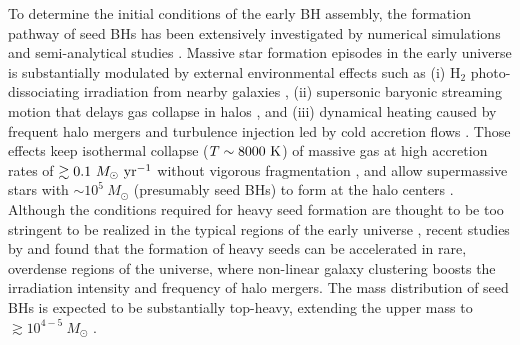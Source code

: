 \documentclass[twocolumn, twocolappendix]{aastex63}
\newcommand{\Msun}{M_\odot}
\newcommand{\Msunyr}{M_\odot~{\rm yr}^{-1}}
\begin{document}
\begin{CJK*}{UTF8}{gbsn}
To determine the initial conditions of the early BH assembly,
the formation pathway of seed BHs has been extensively investigated by numerical simulations and semi-analytical studies
\citep{2006MNRAS.370..289B,2009MNRAS.396..343R,2009ApJ...696.1798T,2012MNRAS.422.2051N,2014ApJ...781...60H,
2015MNRAS.448..568H,2018MNRAS.474.3825V,2021MNRAS.506..613S,2022arXiv220614459T,2022arXiv220505717B}.
Massive star formation episodes in the early universe is substantially modulated by external environmental effects such as
(i) H$_2$ photo-dissociating irradiation from nearby galaxies
\citep{2001ApJ...546..635O,2002ApJ...569..558O,2003Natur.425..812B,2010MNRAS.402.1249S,2014MNRAS.445..544S,2014MNRAS.445..107V,2016ApJ...832..134C},
(ii) supersonic baryonic streaming motion that delays gas collapse in halos
\citep{2012MNRAS.424.1335F, 2014MNRAS.439.1092T, 2018ApJ...855...17H,2017MNRAS.471.4878S,2018MNRAS.479.4017I},
and (iii) dynamical heating caused by frequent halo mergers and turbulence injection led by cold accretion flows
\citep{2003ApJ...592..645Y,2010Natur.466.1082M,2015ApJ...810...51M,2019Natur.566...85W,2022Natur.607...48L}.
Those effects keep isothermal collapse ($T\sim 8000~{\rm K}$) of massive gas at high accretion rates of $\gtrsim 0.1~\Msunyr$
without vigorous fragmentation \citep{2014MNRAS.445L.109I,2015MNRAS.446.2380B,2016PASA...33...51L},
and allow supermassive stars with $\sim 10^5~\Msun$ (presumably seed BHs) to form at the halo centers 
\citep{2013ApJ...778..178H,2013A&A...558A..59S,2019PASA...36...27W,2022arXiv220614459T}.
Although the conditions required for heavy seed formation are thought to be too stringent to be realized in the typical regions of the early universe
\citep{2008MNRAS.391.1961D,2009ApJ...695.1430A,2015MNRAS.450.4350I},
recent studies by \citet{2021MNRAS.503.5046L} and \citet{2021ApJ...917...60L} found that the formation of heavy seeds
can be accelerated in rare, overdense regions of the universe, where non-linear galaxy clustering boosts the irradiation intensity
and frequency of halo mergers.
The mass distribution of seed BHs is expected to be substantially top-heavy, extending the upper mass to $\gtrsim 10^{4-5}~\Msun$
\citep{2021ApJ...917...60L, 2022arXiv220614459T}.



\end{CJK*}
\end{document}
